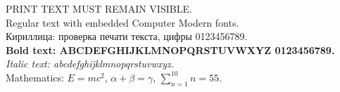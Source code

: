 \documentclass[12pt]{article}
\begin{document}
\noindent PRINT TEXT MUST REMAIN VISIBLE.\\
Regular text with embedded Computer Modern fonts.\\
Кириллица: проверка печати текста, цифры 0123456789.\\
\textbf{Bold text: ABCDEFGHIJKLMNOPQRSTUVWXYZ 0123456789.}\\
\textit{Italic text: abcdefghijklmnopqrstuvwxyz.}\\
Mathematics: $E=mc^2$, $\alpha+\beta=\gamma$, $\sum_{n=1}^{10} n=55$.
\end{document}
